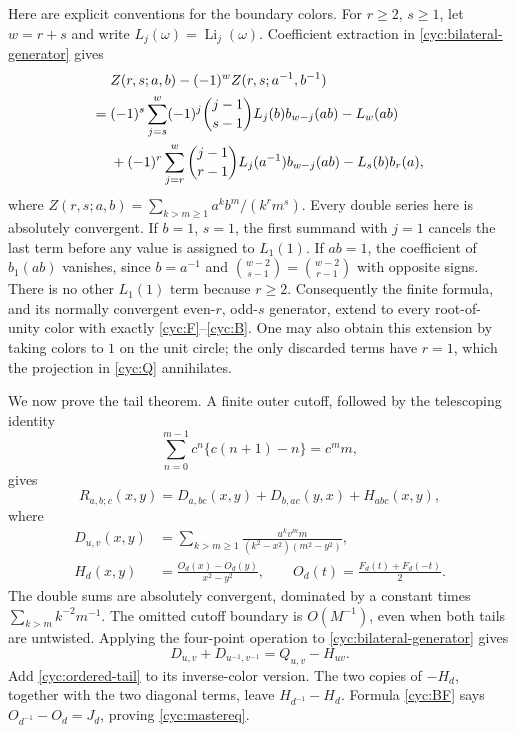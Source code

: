Here are explicit conventions for the boundary colors.  For $r\ge2$,
$s\ge1$, let $w=r+s$ and write $L_j(\omega)=\operatorname{Li}_j(\omega)$.
Coefficient extraction in \eqref{cyc:bilateral-generator} gives
\begin{align}\label{cyc:finite-parity}
 &Z(r,s;a,b)-(-1)^w Z(r,s;a^{-1},b^{-1})\notag\\
 ={}&(-1)^s\sum_{j=s}^{w}(-1)^j
          \binom{j-1}{s-1}L_j(b)b_{w-j}(ab)-L_w(ab)\notag\\
 &+(-1)^r\sum_{j=r}^{w}\binom{j-1}{r-1}
               L_j(a^{-1})b_{w-j}(ab)-L_s(b)b_r(a),
\end{align}
where
$Z(r,s;a,b)=\sum_{k>m\ge1}a^k b^m/(k^r m^s)$.
Every double series here is absolutely convergent.  If $b=1$, $s=1$,
the first summand with $j=1$ cancels the last term before any value
is assigned to $L_1(1)$.  If $ab=1$, the coefficient of $b_1(ab)$
vanishes, since $b=a^{-1}$ and
$\binom{w-2}{s-1}=\binom{w-2}{r-1}$ with opposite signs.
There is no other $L_1(1)$ term because $r\ge2$.  Consequently the
finite formula, and its normally convergent even-$r$, odd-$s$
generator, extend to every root-of-unity color with exactly
\eqref{cyc:F}--\eqref{cyc:B}.  One may also obtain this extension
by taking colors to $1$ on the unit circle; the only discarded
terms have $r=1$, which the projection in \eqref{cyc:Q} annihilates.

We now prove the tail theorem.  A finite outer cutoff, followed by
the telescoping identity
\[
 \sum_{n=0}^{m-1}c^n\{c(n+1)-n\}=c^m m,
\]
gives
\begin{equation}\label{cyc:ordered-tail}
 R_{a,b;c}(x,y)=D_{a,bc}(x,y)+D_{b,ac}(y,x)+H_{abc}(x,y),
\end{equation}
where
\begin{align*}
 D_{u,v}(x,y)&=\sum_{k>m\ge1}
   \frac{u^k v^m m}{(k^2-x^2)(m^2-y^2)},\\
 H_d(x,y)&=\frac{O_d(x)-O_d(y)}{x^2-y^2},\qquad
 O_d(t)=\frac{F_d(t)+F_d(-t)}2.
\end{align*}
The double sums are absolutely convergent, dominated by a constant
times $\sum_{k>m}k^{-2}m^{-1}$.  The omitted cutoff boundary is
$O(M^{-1})$, even when both tails are untwisted.  Applying the
four-point operation to \eqref{cyc:bilateral-generator} gives
\[
 D_{u,v}+D_{u^{-1},v^{-1}}=Q_{u,v}-H_{uv}.
\]
Add \eqref{cyc:ordered-tail} to its inverse-color version.  The two
copies of $-H_d$, together with the two diagonal terms, leave
$H_{d^{-1}}-H_d$.  Formula \eqref{cyc:BF} says
$O_{d^{-1}}-O_d=J_d$, proving \eqref{cyc:mastereq}.

